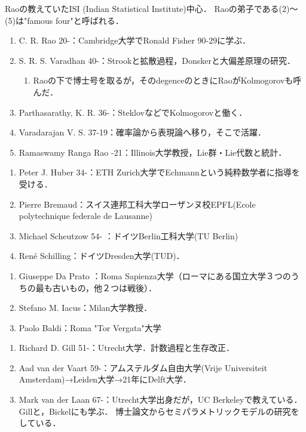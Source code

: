 \documentclass[uplatex,dvipdfmx]{jsreport}
\begin{document}
\begin{history}[インド学派]
    Raoの教えていたISI (Indian Statistical Institute)中心．
    Raoの弟子である(2)～(5)は"famous four"と呼ばれる．
    \begin{enumerate}
        \item C. R. Rao 20-：Cambridge大学でRonald Fisher 90-29に学ぶ．
        \item S. R. S. Varadhan 40-：Strookと拡散過程，Donskerと大偏差原理の研究．
        \begin{enumerate}
            \item Raoの下で博士号を取るが，そのdegenceのときにRaoがKolmogorovも呼んだ．
        \end{enumerate}
        \item Parthasarathy, K. R. 36-：SteklovなどでKolmogorovと働く．
        \item Varadarajan V. S. 37-19：確率論から表現論へ移り，そこで活躍．
        \item Ramaswamy Ranga Rao -21：Illinois大学教授，Lie群・Lie代数と統計．
    \end{enumerate}
\end{history}

\begin{history}[ドイツ語圏]\mbox{}
    \begin{enumerate}
        \item Peter J. Huber 34-：ETH Zurich大学でEchmannという純粋数学者に指導を受ける．
        \item Pierre Bremaud：スイス連邦工科大学ローザンヌ校EPFL(Ecole polytechnique federale de Lausanne)
        \item Michael Scheutzow 54- ：ドイツBerlin工科大学(TU Berlin)
        \item René Schilling：ドイツDresden大学(TUD)．
    \end{enumerate}
\end{history}

\begin{history}[イタリア学派]\mbox{}
    \begin{enumerate}
        \item Giuseppe Da Prato ：Roma Sapienza大学（ローマにある国立大学３つのうちの最も古いもの，他２つは戦後）．
        \item Stefano M. Iacus：Milan大学教授．
        \item Paolo Baldi：Roma "Tor Vergata"大学
    \end{enumerate}
\end{history}

\begin{history}[オランダ学派]
    \begin{enumerate}
        \item Richard D. Gill 51-：Utrecht大学．計数過程と生存改正．
        \item Aad van der Vaart 59-：アムステルダム自由大学(Vrije Universiteit Amsterdam)→Leiden大学→21年にDelft大学．
        \item Mark van der Laan 67-：Utrecht大学出身だが，UC Berkeleyで教えている．Gillと，Bickelにも学ぶ．
        博士論文からセミパラメトリックモデルの研究をしている．
    \end{enumerate}
\end{history}
\end{document}
